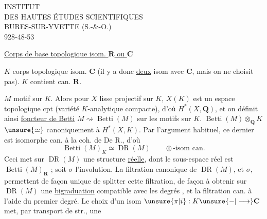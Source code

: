 INSTITUT\\
DES HAUTES ÉTUDES SCIENTIFIQUES\\
BURES-SUR-YVETTE (S.-\&-O.)\\
928-48-53

\uline{Corps de base topologique isom.  $\mathbf R$ ou $\mathbf C$}

$K$ corps topologique isom.  $\mathbf C$ (il y a donc \uline{deux} isom avec $\mathbf C$, mais on ne choisit pas). $K$ contient can. $\mathbf R$.

$M$ motif sur $K$. Alors  pour  $X$ lisse projectif sur $K$, $X(K)$ est un espace topologique cpt (variété $K$-analytique compacte), d'où $H^*(X,\mathbf Q)$, et on définit ainsi \uline{foncteur de Betti} $M\rightsquigarrow\operatorname{Betti}(M)$ sur les motifs sur $K$. $\operatorname{Betti}(M)\otimes_{\mathbf Q}K$ $\unsure{\simeq}$ canoniquement à $H^*(X,K)$. Par l'argument habituel, ce dernier est isomorphe can. à la coh. de De R., d'où
\[
\operatorname{Betti}(M)_K\simeq\operatorname{DR}(M)
\qquad\otimes\text{-isom can.}
\]
Ceci met sur  $\operatorname{DR}(M)$ une structure \uline{réelle}, dont le sous-espace réel est $\operatorname{Betti}(M)_{\mathbf R}$ ; soit $\sigma$ l'involution. La filtration canonique de $\operatorname{DR}(M)$, et $\sigma$, permettent de façon unique de splitter cette filtration, de façon à obtenir sur $\operatorname{DR}(M)$ une \uline{bigraduation} compatible avec les degrés , et  la filtration can. à l'aide du premier degré. Le choix d'un isom $\unsure{\pi|i}:K\unsure{-|\longrightarrow}\mathbf C$ met, par transport de str., une

